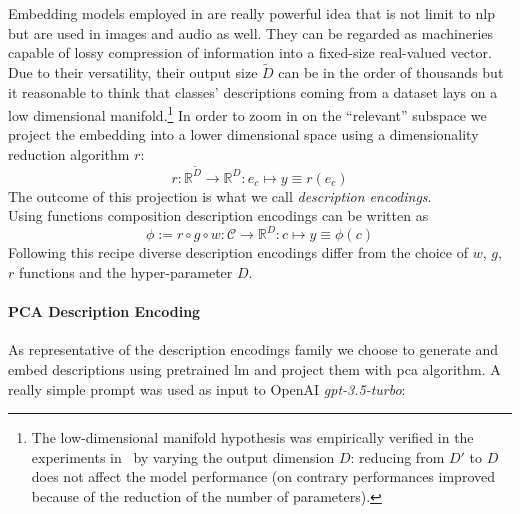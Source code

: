 Embedding models employed in  are really powerful idea that is not limit to \acrshort{nlp} but are used in images and audio as well.
They can be regarded as machineries capable of lossy compression of information into a fixed-size real-valued vector. Due to their versatility, their output size $\tilde{D}$ can be in the order of thousands but it reasonable to think that classes' descriptions coming from a dataset lays on a low dimensional manifold.\footnote{The low-dimensional manifold hypothesis was empirically verified in the experiments in~ by varying the output dimension $D$: reducing from $D'$ to $D$ does not affect the model performance (on contrary performances improved because of the reduction of the number of parameters).}
In order to zoom in on the ``relevant'' subspace we project the embedding into a lower dimensional space using a dimensionality reduction algorithm $r$:
\begin{equation}
  r : \mathbb{R}^{\tilde{D}} \to \mathbb{R}^{D} :
  e_c \mapsto y \equiv r(e_c)
  \label{eq:embedding-projection}
\end{equation}
The outcome of this projection is what we call \emph{description encodings}.\\

Using functions composition description encodings can be written as
\begin{equation}
  \phi := r \circ g \circ w : \mathcal{C} \to \mathbb{R}^{D} :
  c \mapsto y \equiv \phi(c)
  \label{eq:desc-encoding}
\end{equation}
Following this recipe diverse description encodings differ from the choice of $w$, $g$, $r$  functions and the hyper-parameter $D$.

\paragraph{PCA Description Encoding}\label{par:encoding-desc} As representative of the description encodings family we choose to generate and embed descriptions using pretrained \acrshort{lm} and project them with \acrfull{pca} algorithm.
A really simple prompt was used as input to OpenAI \emph{gpt-3.5-turbo}:

\vspace{10pt}

